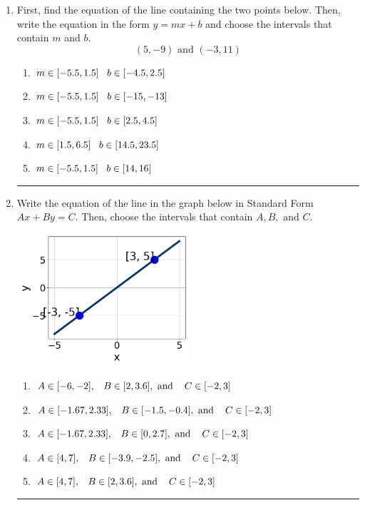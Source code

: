 \documentclass[14pt]{extbook}
\newcommand{\litem}[1]{\item#1\hspace*{-1cm}\rule{\textwidth}{0.4pt}}
\begin{document}
\begin{enumerate}
\litem{
First, find the equation of the line containing the two points below. Then, write the equation in the form $ y=mx+b $ and choose the intervals that contain $m$ and $b$.\[ (5, -9) \text{ and } (-3, 11) \]\begin{enumerate}[label=\Alph*.]
\item \( m \in [-5.5, 1.5] \hspace*{3mm} b \in [-4.5, 2.5] \)
\item \( m \in [-5.5, 1.5] \hspace*{3mm} b \in [-15, -13] \)
\item \( m \in [-5.5, 1.5] \hspace*{3mm} b \in [2.5, 4.5] \)
\item \( m \in [1.5, 6.5] \hspace*{3mm} b \in [14.5, 23.5] \)
\item \( m \in [-5.5, 1.5] \hspace*{3mm} b \in [14, 16] \)

\end{enumerate} }
\litem{
Write the equation of the line in the graph below in Standard Form $Ax+By=C$. Then, choose the intervals that contain $A, B, \text{ and } C$.
\begin{center}
    \includegraphics[width=0.5\textwidth]{../Figures/linearGraphToStandardCopyB.png}
\end{center}
\begin{enumerate}[label=\Alph*.]
\item \( A \in [-6, -2], \hspace{3mm} B \in [2, 3.6], \text{ and } \hspace{3mm} C \in [-2, 3] \)
\item \( A \in [-1.67, 2.33], \hspace{3mm} B \in [-1.5, -0.4], \text{ and } \hspace{3mm} C \in [-2, 3] \)
\item \( A \in [-1.67, 2.33], \hspace{3mm} B \in [0, 2.7], \text{ and } \hspace{3mm} C \in [-2, 3] \)
\item \( A \in [4, 7], \hspace{3mm} B \in [-3.9, -2.5], \text{ and } \hspace{3mm} C \in [-2, 3] \)
\item \( A \in [4, 7], \hspace{3mm} B \in [2, 3.6], \text{ and } \hspace{3mm} C \in [-2, 3] \)


\end{enumerate}}
\end{enumerate}
\end{document}
